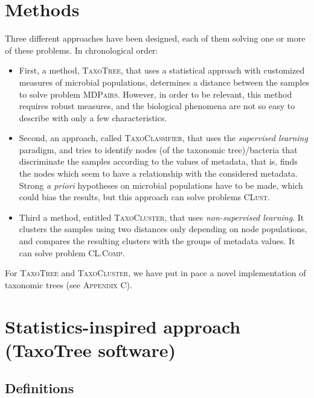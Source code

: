 \documentclass{report}
\begin{document}
\newpage

\chapter*{Methods}

Three different approaches have been designed, each of them solving one or more of these problems. In chronological order:
\begin{itemize}
\item First, a method, \textsc{TaxoTree}, that uses a statistical approach with customized measures of microbial populations, determines a distance between the samples to solve problem \textsc{MDPairs}. However, in order to be relevant, this method requires robust measures, and the biological phenomena are not so easy to describe with only a few characteristics.
\item Second, an approach, called \textsc{TaxoClassifier}, that uses the \emph{supervised learning} paradigm, and tries to identify nodes (of the taxonomic tree)/bacteria that discriminate the samples according to the values of metadata, that is, finds the nodes which seem to have a relationship with the considered metadata. Strong \emph{a priori} hypotheses on microbial populations have to be made, which could bias the results, but this approach can solve problems \textsc{CLust}.
\item Third a method, entitled \textsc{TaxoCluster}, that uses \emph{non-supervised learning}. It clusters the samples using two distances only depending on node populations, and compares the resulting clusters with the groups of metadata values. It can solve problem \textsc{CL.Comp}.
\end{itemize}

For \textsc{TaxoTree} and \textsc{TaxoCluster}, we have put in pace a novel implementation of taxonomic trees (see \textsc{Appendix C}).

\chapter{Statistics-inspired approach (TaxoTree software)}

\section{Definitions}
\end{document}
